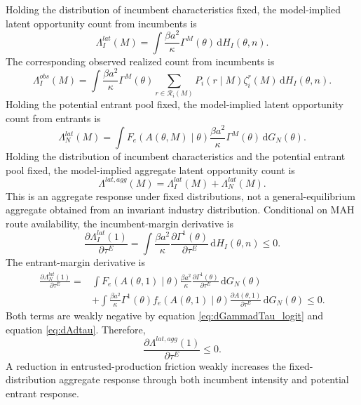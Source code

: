 \documentclass[12pt]{article}
\newcommand{\1}{\mathbf{1}}
\newcommand{\dd}{\mathrm{d}}
\newcommand{\calR}{\mathcal{R}}
\begin{document}
Holding the distribution of incumbent characteristics fixed, the model-implied latent opportunity count from incumbents is
\begin{equation}
    \Lambda_I^{lat}(M)
    =
    \int
    \frac{\beta a^2}{\kappa}
    \Gamma^M(\theta)
    \,\dd H_I(\theta,n).
    \label{eq:LambdaI}
\end{equation}
The corresponding observed realized count from incumbents is
\begin{equation}
    \Lambda_I^{obs}(M)
    =
    \int
    \frac{\beta a^2}{\kappa}
    \Gamma^M(\theta)
    \sum_{r\in\calR_i(M)}P_i(r\mid M)\zeta_i^r(M)
    \,\dd H_I(\theta,n).
    \label{eq:LambdaIobs}
\end{equation}
Holding the potential entrant pool fixed, the model-implied latent opportunity count from entrants is
\begin{equation}
    \Lambda_N^{lat}(M)
    =
    \int
    F_e\!\left(A(\theta,M)\mid\theta\right)
    \frac{\beta a^2}{\kappa}
    \Gamma^M(\theta)
    \,\dd G_N(\theta).
    \label{eq:LambdaN}
\end{equation}
Holding the distribution of incumbent characteristics and the potential entrant pool fixed, the model-implied aggregate latent opportunity count is
\begin{equation}
    \Lambda^{lat,agg}(M)=\Lambda_I^{lat}(M)+\Lambda_N^{lat}(M).
    \label{eq:LambdaAgg}
\end{equation}
This is an aggregate response under fixed distributions, not a general-equilibrium aggregate obtained from an invariant industry distribution.
Conditional on MAH route availability, the incumbent-margin derivative is
\begin{equation}
    \frac{\partial \Lambda_I^{lat}(1)}{\partial\tau^E}
    =
    \int
    \frac{\beta a^2}{\kappa}
    \frac{\partial\Gamma^1(\theta)}{\partial\tau^E}
    \,\dd H_I(\theta,n)
    \le0.
    \label{eq:dLambdaI}
\end{equation}
The entrant-margin derivative is
\begin{align}
    \frac{\partial \Lambda_N^{lat}(1)}{\partial\tau^E}
    =&
    \int
    F_e\!\left(A(\theta,1)\mid\theta\right)
    \frac{\beta a^2}{\kappa}
    \frac{\partial\Gamma^1(\theta)}{\partial\tau^E}
    \,\dd G_N(\theta)
    \nonumber\\
    &+
    \int
    \frac{\beta a^2}{\kappa}
    \Gamma^1(\theta)
    f_e\!\left(A(\theta,1)\mid\theta\right)
    \frac{\partial A(\theta,1)}{\partial\tau^E}
    \,\dd G_N(\theta)
    \le0.
    \label{eq:dLambdaN}
\end{align}
Both terms are weakly negative by equation \eqref{eq:dGammadTau_logit} and equation \eqref{eq:dAdtau}. Therefore,
\begin{equation}
    \frac{\partial \Lambda^{lat,agg}(1)}{\partial\tau^E}\le0.
    \label{eq:dLambdaAgg}
\end{equation}
A reduction in entrusted-production friction weakly increases the fixed-distribution aggregate response through both incumbent intensity and potential entrant response.
\end{document}
